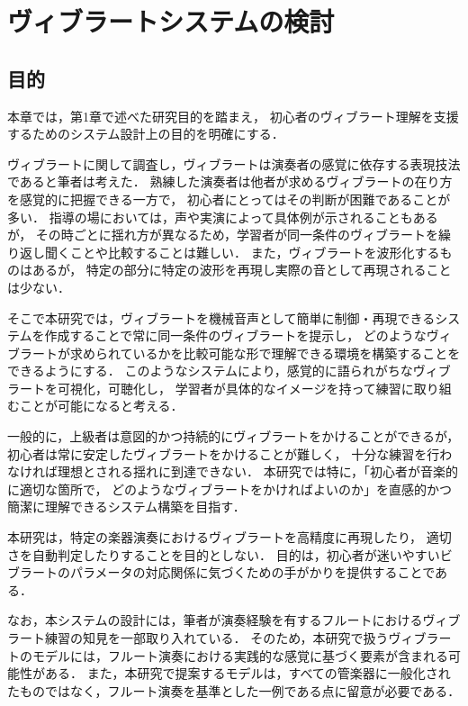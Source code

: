 \section{ヴィブラートシステムの検討}

\subsection{目的}

本章では，第1章で述べた研究目的を踏まえ，
初心者のヴィブラート理解を支援するためのシステム設計上の目的を明確にする．

ヴィブラートに関して調査し，ヴィブラートは演奏者の感覚に依存する表現技法であると筆者は考えた．
熟練した演奏者は他者が求めるヴィブラートの在り方を感覚的に把握できる一方で，
初心者にとってはその判断が困難であることが多い．
指導の場においては，声や実演によって具体例が示されることもあるが，
その時ごとに揺れ方が異なるため，学習者が同一条件のヴィブラートを繰り返し聞くことや比較することは難しい．
また，ヴィブラートを波形化するもの\cite{Miyazaki19}はあるが，
特定の部分に特定の波形を再現し実際の音として再現されることは少ない．

そこで本研究では，ヴィブラートを機械音声として簡単に制御・再現できるシステムを作成することで常に同一条件のヴィブラートを提示し，
どのようなヴィブラートが求められているかを比較可能な形で理解できる環境を構築することをできるようにする．
このようなシステムにより，感覚的に語られがちなヴィブラートを可視化，可聴化し，
学習者が具体的なイメージを持って練習に取り組むことが可能になると考える．

一般的に，上級者は意図的かつ持続的にヴィブラートをかけることができるが，
初心者は常に安定したヴィブラートをかけることが難しく，
十分な練習を行わなければ理想とされる揺れに到達できない．
本研究では特に，「初心者が音楽的に適切な箇所で，
どのようなヴィブラートをかければよいのか」を直感的かつ簡潔に理解できるシステム構築を目指す．

本研究は，特定の楽器演奏におけるヴィブラートを高精度に再現したり，
適切さを自動判定したりすることを目的としない．
目的は，初心者が迷いやすいビブラートのパラメータの対応関係に気づくための手がかりを提供することである．

なお，本システムの設計には，筆者が演奏経験を有するフルートにおけるヴィブラート練習の知見を一部取り入れている．
そのため，本研究で扱うヴィブラートのモデルには，フルート演奏における実践的な感覚に基づく要素が含まれる可能性がある．
また，本研究で提案するモデルは，すべての管楽器に一般化されたものではなく，フルート演奏を基準とした一例である点に留意が必要である．


